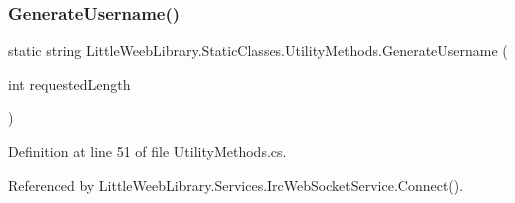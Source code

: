 \subsubsection{\texorpdfstring{Generate\+Username()}{GenerateUsername()}}
{\footnotesize\ttfamily static string Little\+Weeb\+Library.\+Static\+Classes.\+Utility\+Methods.\+Generate\+Username (\begin{DoxyParamCaption}\item[{int}]{requested\+Length }\end{DoxyParamCaption})\hspace{0.3cm}{\ttfamily [static]}}



Definition at line 51 of file Utility\+Methods.\+cs.



Referenced by Little\+Weeb\+Library.\+Services.\+Irc\+Web\+Socket\+Service.\+Connect().


